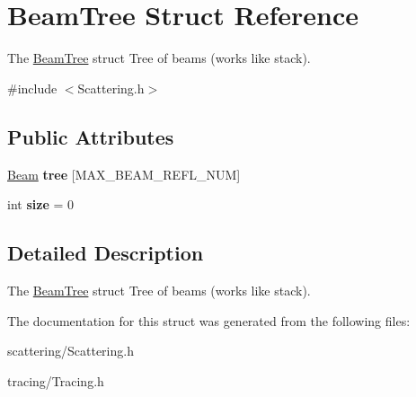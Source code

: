 \hypertarget{struct_beam_tree}{}\section{Beam\+Tree Struct Reference}
\label{struct_beam_tree}


The \mbox{\hyperlink{struct_beam_tree}{Beam\+Tree}} struct Tree of beams (works like stack).  




{\ttfamily \#include $<$Scattering.\+h$>$}

\subsection*{Public Attributes}
\begin{DoxyCompactItemize}
\item 
\mbox{\label{struct_beam_tree_aad5bebdadbaebb961eb33c3e7a7f9d7a}} 
\mbox{\hyperlink{class_beam}{Beam}} {\bfseries tree} \mbox{[}M\+A\+X\+\_\+\+B\+E\+A\+M\+\_\+\+R\+E\+F\+L\+\_\+\+N\+UM\mbox{]}
\item 
\mbox{\label{struct_beam_tree_ac1d4c414b0f572ab75eea1dd0644fb87}} 
int {\bfseries size} = 0
\end{DoxyCompactItemize}


\subsection{Detailed Description}
The \mbox{\hyperlink{struct_beam_tree}{Beam\+Tree}} struct Tree of beams (works like stack). 

The documentation for this struct was generated from the following files\+:\begin{DoxyCompactItemize}
\item 
scattering/Scattering.\+h\item 
tracing/Tracing.\+h\end{DoxyCompactItemize}
